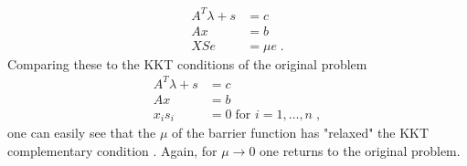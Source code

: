 \begin{subequations}
\begin{align}
	A^T \lambda + s &= c \\
	A x &= b \\
	X S e &= \mu e \; .
\end{align}
\end{subequations}
Comparing these to the KKT conditions of the original problem
\begin{subequations}
\begin{align}
	A^T \lambda + s &= c \\
	A x &= b \\
	x_i s_i &= 0 \; \text{for } i = 1, \ldots , n  \; ,
\end{align}
\end{subequations}
one can easily see that the $\mu$ of the barrier function has "relaxed" the KKT complementary condition \cite{ipnote}. Again, for $\mu \to 0$ one returns to the original problem. 


